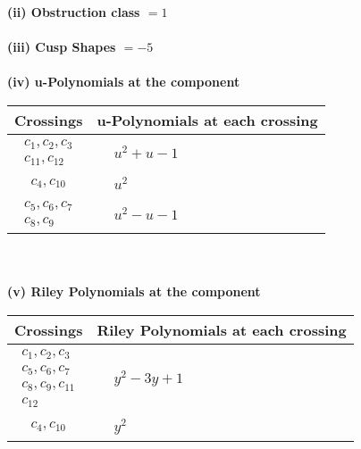 \documentclass[1p]{elsarticle_modified}
\theoremstyle{definition}
\begin{document}
\flushleft \textbf{(ii) Obstruction class $= 1$}\\~\\
\flushleft \textbf{(iii) Cusp Shapes $= -5$}\\~\\
\newpage\renewcommand{\arraystretch}{1}
\flushleft \textbf{(iv) u-Polynomials at the component}\newline \\
\begin{tabular}{m{50pt}|m{274pt}}
Crossings & \hspace{64pt}u-Polynomials at each crossing \\
\hline $$\begin{aligned}c_{1},c_{2},c_{3}\\c_{11},c_{12}\end{aligned}$$&$\begin{aligned}
&u^2+u-1
\end{aligned}$\\
\hline $$\begin{aligned}c_{4},c_{10}\end{aligned}$$&$\begin{aligned}
&u^2
\end{aligned}$\\
\hline $$\begin{aligned}c_{5},c_{6},c_{7}\\c_{8},c_{9}\end{aligned}$$&$\begin{aligned}
&u^2- u-1
\end{aligned}$\\
\hline
\end{tabular}\\~\\
\newpage\renewcommand{\arraystretch}{1}
\flushleft \textbf{(v) Riley Polynomials at the component}\newline \\
\begin{tabular}{m{50pt}|m{274pt}}
Crossings & \hspace{64pt}Riley Polynomials at each crossing \\
\hline $$\begin{aligned}c_{1},c_{2},c_{3}\\c_{5},c_{6},c_{7}\\c_{8},c_{9},c_{11}\\c_{12}\end{aligned}$$&$\begin{aligned}
&y^2-3 y+1
\end{aligned}$\\
\hline $$\begin{aligned}c_{4},c_{10}\end{aligned}$$&$\begin{aligned}
&y^2
\end{aligned}$\\
\hline
\end{tabular}\\~\\
\end{document}
